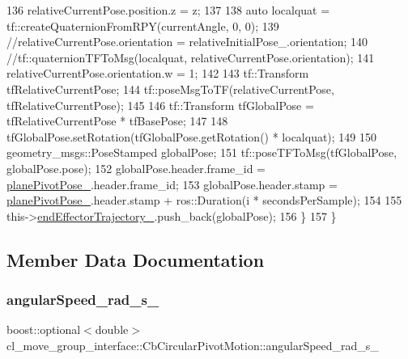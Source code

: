 \begin{DoxyCode}
136                 relativeCurrentPose.position.z = z;
137 
138                 \textcolor{keyword}{auto} localquat = tf::createQuaternionFromRPY(currentAngle, 0, 0);
139                 \textcolor{comment}{//relativeCurrentPose.orientation = relativeInitialPose\_.orientation;}
140                 \textcolor{comment}{//tf::quaternionTFToMsg(localquat, relativeCurrentPose.orientation);}
141                 relativeCurrentPose.orientation.w = 1;
142 
143                 tf::Transform tfRelativeCurrentPose;
144                 tf::poseMsgToTF(relativeCurrentPose, tfRelativeCurrentPose);
145 
146                 tf::Transform tfGlobalPose = tfRelativeCurrentPose * tfBasePose;
147 
148                 tfGlobalPose.setRotation(tfGlobalPose.getRotation() * localquat);
149 
150                 geometry\_msgs::PoseStamped globalPose;
151                 tf::poseTFToMsg(tfGlobalPose, globalPose.pose);
152                 globalPose.header.frame\_id = \hyperlink{classcl__move__group__interface_1_1CbCircularPivotMotion_a0994efbe93b9f9a61fcf3703c360cda2}{planePivotPose\_}.header.frame\_id;
153                 globalPose.header.stamp = \hyperlink{classcl__move__group__interface_1_1CbCircularPivotMotion_a0994efbe93b9f9a61fcf3703c360cda2}{planePivotPose\_}.header.stamp + ros::Duration(i * 
      secondsPerSample);
154 
155                 this->\hyperlink{classcl__move__group__interface_1_1CbMoveEndEffectorTrajectory_ae13dfd31ea3660646e03882f0c2c29f0}{endEffectorTrajectory\_}.push\_back(globalPose);
156             \}
157         \}
\end{DoxyCode}


\subsection{Member Data Documentation}
\mbox{\label{classcl__move__group__interface_1_1CbCircularPivotMotion_a39fa383804d82285e07fa1c5a37cc587}} 
\subsubsection{\texorpdfstring{angular\+Speed\+\_\+rad\+\_\+s\+\_\+}{angularSpeed\_rad\_s\_}}
{\footnotesize\ttfamily boost\+::optional$<$double$>$ cl\+\_\+move\+\_\+group\+\_\+interface\+::\+Cb\+Circular\+Pivot\+Motion\+::angular\+Speed\+\_\+rad\+\_\+s\+\_\+}



